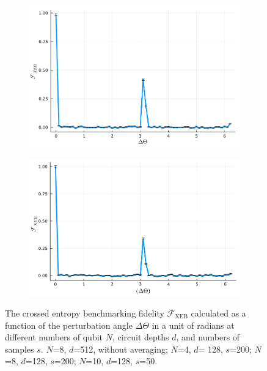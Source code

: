 \documentclass[12pt]{article}
\begin{document}
\begin{figure}[ht]
	\begin{subfigure}[t]{0.42\textwidth}
		\centering
		\includegraphics[width=\linewidth]
		{figures/Task4b_N_8_d_128_s_200}
		\subcaption{\label{fig:task4b_N8}}
	\end{subfigure}%
	\begin{subfigure}[t]{0.42\textwidth}
		\centering
		\includegraphics[width=\linewidth]
		{figures/Task4b_N_10_d_128_s_50_fg}
		\subcaption{\label{fig:task4b_N10}}
	\end{subfigure}%
	\caption{
		The crossed entropy benchmarking fidelity $\mathcal{F}_\mathrm{XEB}$ calculated as a function of the perturbation angle $\Delta \Theta$ in a unit of radians at different numbers of qubit $N$, circuit depths $d$, and numbers of samples $s$.  $N$=8, $d$=512, without averaging;  $N$=4, $d$= 128, $s$=200;  $N$=8, $d$=128, $s$=200;  $N$=10, $d$=128, $s$=50.
	}
	\label{fig:XEBfidelity}
\end{figure}
\end{document}
